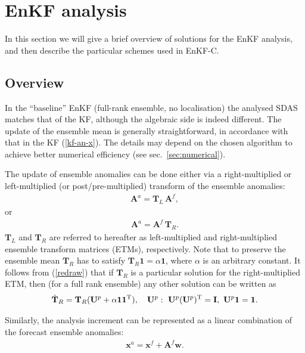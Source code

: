 \documentclass[11pt]{report}
\newcommand{\mb} {\mathbf}
\newcommand{\T}{^{\tiny \mathrm T}}
\begin{document}
\section{EnKF analysis}

In this section we will give a brief overview of solutions for the EnKF analysis, and then describe the particular schemes used in EnKF-C.

\subsection{Overview}

In the ``baseline'' EnKF (full-rank ensemble, no localisation) the analysed SDAS matches that of the KF, although the algebraic side is indeed different.
The update of the ensemble mean is generally straightforward, in accordance with that in the KF (\ref{kf-an-x}).
The details may depend on the chosen algorithm to achieve better numerical efficiency (see sec.~\ref{sec:numerical}).

The update of ensemble anomalies can be done either via a right-multiplied or left-multiplied (or post/pre-multiplied) transform of the ensemble anomalies:
\begin{align}
  \label{T-left}
  \mb A^a = \mb T_L \,\mb A^f,
\end{align}
or
\begin{align}
  \label{T-right}
  \mb A^a = \mb A^f \, \mb T_R.
\end{align}
$\mb T_L$ and $\mb T_R$ are referred to hereafter as left-multiplied and right-multiplied ensemble transform matrices (ETMs), respectively.
Note that to preserve the ensemble mean $\mb T_R$ has to satisfy $\mb T_R \mb 1 = \alpha \mb 1$, where $\alpha$ is an arbitrary constant.
It follows from (\ref{redraw}) that if $\mb T_R$ is a particular solution for the right-multiplied ETM, then (for a full rank ensemble) any other solution can be written as
\begin{align}
  \label{TR-all}
  \tilde{\mb T}_R = \mb T_R (\mb U^p + \alpha \mb 1 \mb 1\T), \quad \mb U^p:\ \mb U^p (\mb U^p)\T = \mb I,\ \mb U^p \mb 1 = \mb 1.
\end{align}

Similarly, the analysis increment can be represented as a linear combination of the forecast ensemble anomalies:
\begin{align}
  \label{w}
  \mb x^a = \mb x^f + \mb A^f \mb w.
\end{align}
\end{document}
